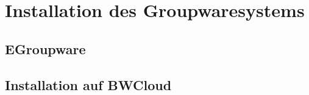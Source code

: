 \chapter{Installation des Groupwaresystems}

\section{EGroupware}

\section{Installation auf BWCloud}